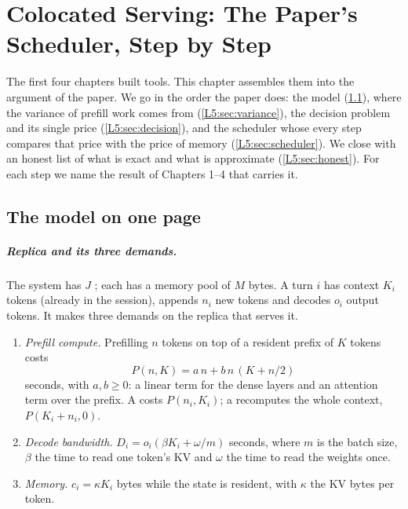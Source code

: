 \chapter{Colocated Serving: The Paper's Scheduler, Step by Step}\label{sec:L5}

The first four chapters built tools. This chapter assembles them into the
argument of the paper. We go in the order the paper does: the model
(\cref{L5:sec:model}), where the variance of prefill work comes from
(\cref{L5:sec:variance}), the decision problem and its single price
(\cref{L5:sec:decision}), and the scheduler whose every step compares that
price with the price of memory (\cref{L5:sec:scheduler}). We close with an
honest list of what is exact and what is approximate
(\cref{L5:sec:honest}). For each step we name the result of Chapters 1--4
that carries it.

\section{The model on one page}\label{L5:sec:model}

\paragraph{Replica and its three demands.}\label{L5:def:replica} The system has $J$ ; each has a memory pool of $M$ bytes.
A turn $i$ has context $K_i$ tokens (already in the session), appends $n_i$
new tokens and decodes $o_i$ output tokens. It makes three demands on the
replica that serves it.
\begin{enumerate}[label=(\alph*)]
\item \emph{Prefill compute.} Prefilling $n$ tokens on top of a resident
  prefix of $K$ tokens costs
  \begin{equation}\label{L5:eq:prefill}
    P(n,K)=a\,n+b\,n\,(K+n/2)
  \end{equation}
  seconds, with $a,b\ge0$: a linear term for the dense layers and an
  attention term over the prefix. A  costs $P(n_i,K_i)$; a
   recomputes the whole context, $P(K_i+n_i,0)$.
\item \emph{Decode bandwidth.} $D_i=o_i(\beta K_i+\omega/m)$ seconds, where
  $m$ is the batch size, $\beta$ the time to read one token's KV and
  $\omega$ the time to read the weights once.
\item \emph{Memory.} $c_i=\kappa K_i$ bytes while the state is resident,
  with $\kappa$ the KV bytes per token.
\end{enumerate}

